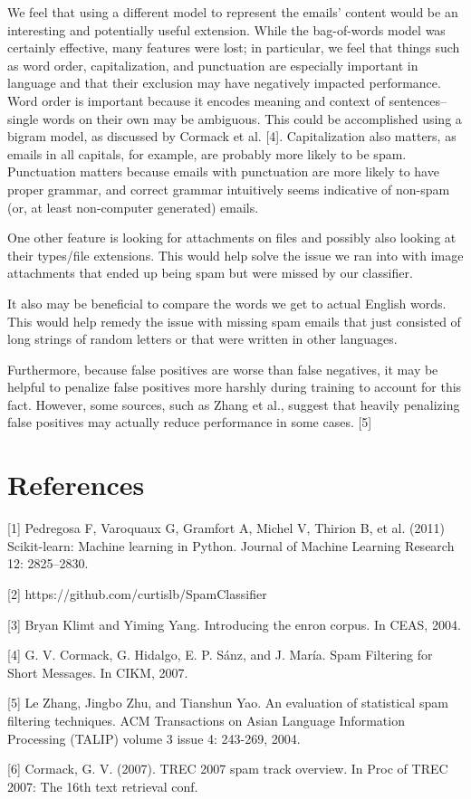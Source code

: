 \documentclass{article} %
\begin{document}
We feel that using a different model to represent the emails' content would be an interesting and potentially useful extension. While the bag-of-words model was certainly effective, many features were lost; in particular, we feel that things such as word order, capitalization, and punctuation are especially important in language and that their exclusion may have negatively impacted performance. Word order is important because it encodes meaning and context of sentences--single words on their own may be ambiguous. This could be accomplished using a bigram model, as discussed by Cormack et al. [4]. Capitalization also matters, as emails in all capitals, for example, are probably more likely to be spam. Punctuation matters because emails with punctuation are more likely to have proper grammar, and correct grammar intuitively seems indicative of non-spam (or, at least non-computer generated) emails. 

One other feature is looking for attachments on files and possibly also looking at their types/file extensions. This would help solve the issue we ran into with image attachments that ended up being spam but were missed by our classifier. 

It also may be beneficial to compare the words we get to actual English words. This would help remedy the issue with missing spam emails that just consisted of long strings of random letters or that were written in other languages. 

Furthermore, because false positives are worse than false negatives, it may be helpful to penalize false positives more harshly during training to account for this fact. However, some sources, such as Zhang et al., suggest that heavily penalizing false positives may actually reduce performance in some cases. [5]

\section{References}

[1] Pedregosa F, Varoquaux G, Gramfort A, Michel V, Thirion B, et al. (2011) Scikit-learn: Machine learning in Python. Journal of Machine Learning Research 12: 2825–2830.

[2] https://github.com/curtislb/SpamClassifier

[3] Bryan Klimt and Yiming Yang. Introducing the enron corpus. In CEAS, 2004.

[4] G. V. Cormack, G. Hidalgo, E. P. Sánz, and J. María. Spam Filtering for Short Messages. In CIKM, 2007.

[5] Le Zhang, Jingbo Zhu, and Tianshun Yao. An evaluation of statistical spam filtering techniques. ACM Transactions on Asian Language Information Processing (TALIP) volume 3 issue 4: 243-269, 2004.

[6] Cormack, G. V. (2007). TREC 2007 spam track overview. In Proc of TREC 2007: The 16th text retrieval conf.
\end{document}
